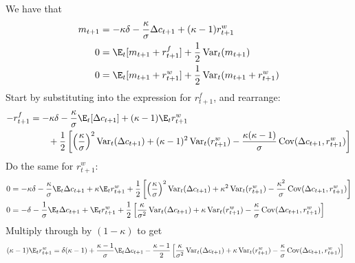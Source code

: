 \documentclass[12pt]{article}
\theoremstyle{plain}
\theoremstyle{definition}
\theoremstyle{remark}
\newcommand{\Cov}{\operatorname{Cov}}
\newcommand{\Var}{\operatorname{Var}}
\begin{document}
\clearpage
We have that
\begin{align*}
  m_{t+1} &=
  -\kappa\delta - \frac{\kappa}{\sigma}\Delta c_{t+1}
  + (\kappa-1)r_{t+1}^w
  \\
  0 &=
  \E_t[m_{t+1}+r^f_{t+1}]
  + \frac{1}{2}
  \Var_t(m_{t+1})
  \\
  0 &=
  \E_t[m_{t+1}+r^w_{t+1}]
  + \frac{1}{2}
  \Var_t(m_{t+1}+r_{t+1}^w)
\end{align*}
Start by substituting into the expression for $r_{t+1}^f$, and rearrange:
\begin{align*}
  -r_{t+1}^f &=
  -\kappa\delta -\frac{\kappa}{\sigma}\E_t[\Delta c_{t+1}]
  + (\kappa-1)\E_tr_{t+1}^w
  \\
  &\qquad
  + \frac{1}{2}
  \left[
    \left(
    \frac{\kappa}{\sigma}
    \right)^2
    \Var_t(\Delta c_{t+1})
    + (\kappa-1)^2 \Var_t(r_{t+1}^w)
    - \frac{\kappa(\kappa-1)}{\sigma}
    \Cov(\Delta c_{t+1},r_{t+1}^w)
  \right]
\end{align*}
Do the same for $r_{t+1}^w$:
\begin{align*}
  0
  &=
  -\kappa\delta
  -\frac{\kappa}{\sigma}\E_t\Delta c_{t+1}
  + \kappa \E_tr_{t+1}^w
  + \frac{1}{2}
  \left[
    \left(
    \frac{\kappa}{\sigma}
    \right)^2
    \Var_t(\Delta c_{t+1})
    + \kappa^2 \Var_t(r_{t+1}^w)
    - \frac{\kappa^2}{\sigma}
    \Cov(\Delta c_{t+1},r_{t+1}^w)
  \right]
  \\
  0
  &=
  -\delta
  -\frac{1}{\sigma}\E_t\Delta c_{t+1}
  + \E_tr_{t+1}^w
  + \frac{1}{2}
  \left[
    \frac{\kappa}{\sigma^2}
    \Var_t(\Delta c_{t+1})
    + \kappa \Var_t(r_{t+1}^w)
    - \frac{\kappa}{\sigma}
    \Cov(\Delta c_{t+1},r_{t+1}^w)
  \right]
\end{align*}
Multiply through by $(1-\kappa)$ to get
\begin{align*}
  (\kappa-1) \E_tr_{t+1}^w
  &=
  \delta(\kappa-1)
  +\frac{\kappa-1}{\sigma}\E_t\Delta c_{t+1}
  - \frac{\kappa-1}{2}
  \left[
    \frac{\kappa}{\sigma^2}
    \Var_t(\Delta c_{t+1})
    + \kappa \Var_t(r_{t+1}^w)
    - \frac{\kappa}{\sigma}
    \Cov(\Delta c_{t+1},r_{t+1}^w)
  \right]
\end{align*}
\end{document}
